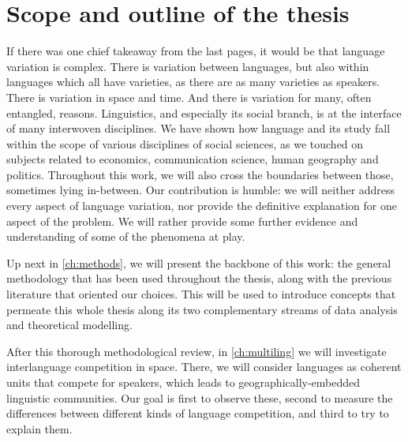 \documentclass[../thesis.tex]{subfiles}
\begin{document}


\section{Scope and outline of the thesis}
If there was one chief takeaway from the last pages, it would be that language variation
is complex. There is variation between languages, but also within languages which all
have varieties, as there are as many varieties as speakers. There is variation in space
and time. And there is variation for many, often entangled, reasons. Linguistics, and
especially its social branch, is at the interface of many interwoven
disciplines. We have shown how language and its study fall within the scope of various
disciplines of social sciences, as we touched on subjects related to economics,
communication science, human geography and politics. Throughout this work, we will also
cross the boundaries between those, sometimes lying in-between. Our contribution is
humble: we will neither address every aspect of language variation,
nor provide the definitive explanation for one aspect of the problem. We will rather
provide some further evidence and understanding of some of the phenomena at play.

Up next in \cref{ch:methods}, we will present the backbone of this work: the general
methodology that has been used throughout the thesis, along with the previous literature
that oriented our choices. This will be used to introduce concepts that permeate this
whole thesis along its two complementary streams of data analysis and theoretical
modelling.

After this thorough methodological review, in \cref{ch:multiling} we will investigate
interlanguage competition in space. There, we will consider languages as coherent units
that compete for speakers, which leads to geographically-embedded linguistic
communities. Our goal is first to observe these, second to measure the differences
between different kinds of language competition, and third to try to explain them.
\end{document}
